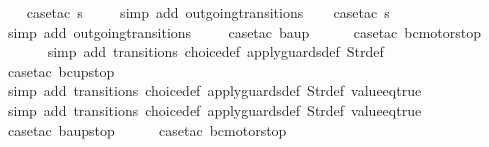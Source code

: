 \begin{isabellebody}
\ \ \isamarkupfalse%
\ {\isacharparenleft}case{\isacharunderscore}tac\ {\isachardoublequoteopen}s{\isacharequal}{}{\isachardoublequoteclose}{\isacharparenright}\isanewline
\ \ \ \isamarkupfalse%
\ {\isacharparenleft}simp\ add{\isacharcolon}\ outgoing{\isacharunderscore}transitions{\isacharunderscore}{}{\isacharparenright}\isanewline
\ \ \isamarkupfalse%
\ {\isacharparenleft}case{\isacharunderscore}tac\ {\isachardoublequoteopen}s{\isacharequal}{}{\isachardoublequoteclose}{\isacharparenright}\isanewline
\ \ \ \isamarkupfalse%
\ {\isacharparenleft}simp\ add{\isacharcolon}\ outgoing{\isacharunderscore}transitions{\isacharunderscore}{}{\isacharparenright}\isanewline
\ \ \ \isamarkupfalse%
\ {\isacharparenleft}case{\isacharunderscore}tac\ {\isachardoublequoteopen}ba{\isacharequal}up{}{}{\isachardoublequoteclose}{\isacharparenright}\isanewline
\ \ \ \ \isamarkupfalse%
\ {\isacharparenleft}case{\isacharunderscore}tac\ {\isachardoublequoteopen}bc{\isacharequal}motorstop\ {}{\isachardoublequoteclose}{\isacharparenright}\isanewline
\ \ \ \ \ \isamarkupfalse%
\ {\isacharparenleft}simp\ add{\isacharcolon}\ transitions\ choice{\isacharunderscore}def\ apply{\isacharunderscore}guards{\isacharunderscore}def\ Str{\isacharunderscore}def{\isacharparenright}\isanewline
\ \ \ \ \isamarkupfalse%
\ {\isacharparenleft}case{\isacharunderscore}tac\ {\isachardoublequoteopen}bc{\isacharequal}up{}{}stop{\isachardoublequoteclose}{\isacharparenright}\isanewline
\ \ \ \ \ \isamarkupfalse%
\ {\isacharparenleft}simp\ add{\isacharcolon}\ transitions\ choice{\isacharunderscore}def\ apply{\isacharunderscore}guards{\isacharunderscore}def\ Str{\isacharunderscore}def\ value{\isacharunderscore}eq{\isacharunderscore}true{\isacharparenright}\isanewline
\ \ \ \ \ \isamarkupfalse%
\ {\isacharparenleft}simp\ add{\isacharcolon}\ transitions\ choice{\isacharunderscore}def\ apply{\isacharunderscore}guards{\isacharunderscore}def\ Str{\isacharunderscore}def\ value{\isacharunderscore}eq{\isacharunderscore}true{\isacharparenright}\isanewline
\ \ \ \isamarkupfalse%
\ {\isacharparenleft}case{\isacharunderscore}tac\ {\isachardoublequoteopen}ba{\isacharequal}up{}{}stop{\isachardoublequoteclose}{\isacharparenright}\isanewline
\ \ \ \ \isamarkupfalse%
\ {\isacharparenleft}case{\isacharunderscore}tac\ {\isachardoublequoteopen}bc{\isacharequal}motorstop\ {}{\isachardoublequoteclose}{\isacharparenright}\isanewline

\end{isabellebody}
